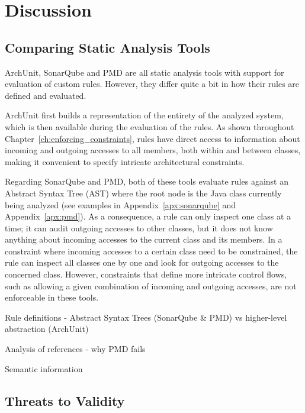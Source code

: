 \chapter{Discussion}


\section{Comparing Static Analysis Tools}
ArchUnit, SonarQube and PMD are all static analysis tools with support for evaluation of custom rules. However, they differ quite a bit in how their rules are defined and evaluated.

ArchUnit first builds a representation of the entirety of the analyzed system, which is then available during the evaluation of the rules. As shown throughout Chapter~\ref{ch:enforcing_constraints}, rules have direct access to information about incoming and outgoing accesses to all members, both within and between classes, making it convenient to specify intricate architectural constraints.

Regarding SonarQube and PMD, both of these tools evaluate rules against an Abstract Syntax Tree (AST) where the root node is the Java class currently being analyzed (see examples in Appendix~\ref{apx:sonarqube} and Appendix~\ref{apx:pmd}). As a consequence, a rule can only inspect one class at a time; it can audit outgoing accesses to other classes, but it does not know anything about incoming accesses to the current class and its members.
In a constraint where incoming accesses to a certain class need to be constrained, the rule can inspect all classes one by one and look for outgoing accesses to the concerned class. However, constraints that define more intricate control flows, such as allowing a given combination of incoming and outgoing accesses, are not enforceable in these tools.

Rule definitions - Abstract Syntax Trees (SonarQube \& PMD) vs higher-level abstraction (ArchUnit)

Analysis of references - why PMD fails

Semantic information

\section{Threats to Validity}

